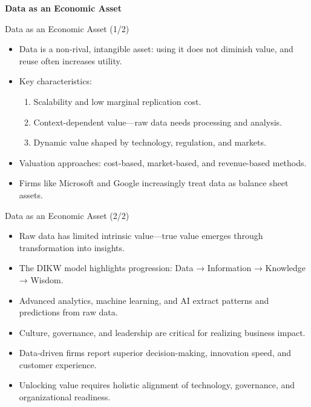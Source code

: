 \documentclass[aspectratio=169, table]{beamer}
\begin{document}
	\begin{frame}{\hfill}
		\centering
		\Huge{\textbf{Data as an Economic Asset}}
	\end{frame}
	
	\begin{frame}{Data as an Economic Asset (1/2)}
		\vspace{20pt}
		\begin{itemize}
			\item Data is a non-rival, intangible asset: using it does not diminish value, and reuse often increases utility.  
			\item Key characteristics:  
			\begin{enumerate}
				\item Scalability and low marginal replication cost.  
				\item Context-dependent value—raw data needs processing and analysis.  
				\item Dynamic value shaped by technology, regulation, and markets.  
			\end{enumerate}
			\item Valuation approaches: cost-based, market-based, and revenue-based methods.  
			\item Firms like Microsoft and Google increasingly treat data as balance sheet assets.  
		\end{itemize}
	\end{frame}
	
	\begin{frame}{Data as an Economic Asset (2/2)}
		\vspace{20pt}
		\begin{itemize}
			\item Raw data has limited intrinsic value—true value emerges through transformation into insights.  
			\item The DIKW model highlights progression: Data → Information → Knowledge → Wisdom.  
			\item Advanced analytics, machine learning, and AI extract patterns and predictions from raw data.  
			\item Culture, governance, and leadership are critical for realizing business impact.  
			\item Data-driven firms report superior decision-making, innovation speed, and customer experience.  
			\item Unlocking value requires holistic alignment of technology, governance, and organizational readiness.  
		\end{itemize}
	\end{frame}
	
\end{document}
